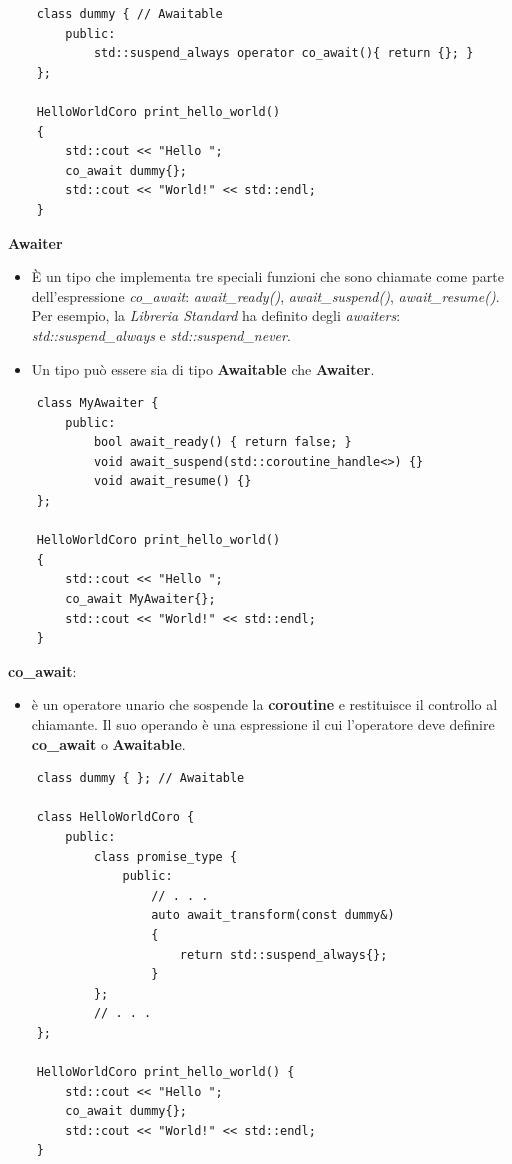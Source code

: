 \begin{lstlisting}
	class dummy { // Awaitable
		public:
			std::suspend_always operator co_await(){ return {}; }
	};

	HelloWorldCoro print_hello_world() 
	{
		std::cout << "Hello ";
		co_await dummy{}; 
		std::cout << "World!" << std::endl;
	}
\end{lstlisting}

\textsf{\small \textbf{Awaiter}} \\

\begin{itemize}
	\item \textsf{\small È un tipo che implementa tre speciali funzioni che sono chiamate come parte dell'espressione \emph{co\_await}: \emph{await\_ready()}, \emph{await\_suspend()}, \emph{await\_resume()}. Per esempio, la \emph{Libreria Standard} ha definito degli \emph{awaiters}: \emph{std::suspend\_always} e \emph{std::suspend\_never}.}
	\item \textsf{\small Un tipo può essere sia di tipo \textbf{Awaitable} che \textbf{Awaiter}.}
\end{itemize}

\begin{lstlisting}
	class MyAwaiter {
		public:
			bool await_ready() { return false; } 
			void await_suspend(std::coroutine_handle<>) {} 
			void await_resume() {}
	};
	
	HelloWorldCoro print_hello_world() 
	{
		std::cout << "Hello ";
		co_await MyAwaiter{};
		std::cout << "World!" << std::endl;
	}
\end{lstlisting}

\textsf{\small \textbf{co\_await}: } \\

\begin{itemize}
	\item \textsf{\small è un operatore unario che sospende la \textbf{coroutine} e restituisce il controllo al chiamante. Il suo operando è una espressione il cui l'operatore deve definire \textbf{co\_await} o \textbf{Awaitable}.}
\end{itemize}

\begin{lstlisting}
	class dummy { }; // Awaitable
	
	class HelloWorldCoro {
		public:
			class promise_type {
				public:
					// . . .
					auto await_transform(const dummy&) 
					{
						return std::suspend_always{};
					}
			};
			// . . .
	};
	
	HelloWorldCoro print_hello_world() {
		std::cout << "Hello ";
		co_await dummy{}; 
		std::cout << "World!" << std::endl;
	}
\end{lstlisting}

